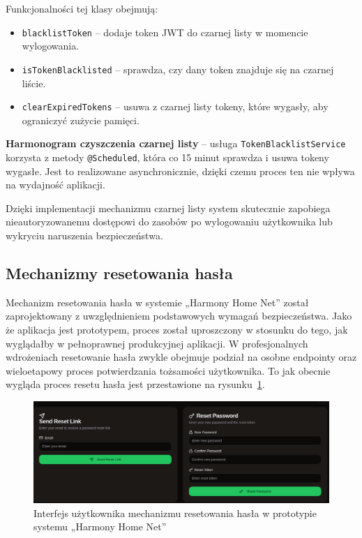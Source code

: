 Funkcjonalności tej klasy obejmują:
\begin{itemize}
    \item \texttt{blacklistToken} -- dodaje token JWT do czarnej listy w momencie wylogowania.
    \item \texttt{isTokenBlacklisted} -- sprawdza, czy dany token znajduje się na czarnej liście.
    \item \texttt{clearExpiredTokens} -- usuwa z czarnej listy tokeny, które wygasły, aby ograniczyć zużycie pamięci.
\end{itemize}

\textbf{Harmonogram czyszczenia czarnej listy} --  usługa \texttt{TokenBlacklistService} korzysta z metody \texttt{@Scheduled}, która co 15 minut sprawdza i usuwa tokeny wygasłe. Jest to realizowane asynchronicznie, dzięki czemu proces ten nie wpływa na wydajność aplikacji.

Dzięki implementacji mechanizmu czarnej listy system skutecznie zapobiega nieautoryzowanemu dostępowi do zasobów po wylogowaniu użytkownika lub wykryciu naruszenia bezpieczeństwa.

\subsection{Mechanizmy resetowania hasła}

Mechanizm resetowania hasła w systemie „Harmony Home Net” został zaprojektowany z uwzględnieniem podstawowych wymagań bezpieczeństwa. Jako że aplikacja jest prototypem, proces został uproszczony w stosunku do tego, jak wyglądałby w pełnoprawnej produkcyjnej aplikacji. W profesjonalnych wdrożeniach resetowanie hasła zwykle obejmuje podział na osobne endpointy oraz wieloetapowy proces potwierdzania tożsamości użytkownika. To jak obecnie wygląda proces resetu hasła jest przestawione na rysunku~\ref{fig:ui_password_reset}.

\begin{figure}[ht]
    \centering
    \includegraphics[width=0.63\linewidth]{rys03/pass_resert}
    \caption{Interfejs użytkownika mechanizmu resetowania hasła w prototypie systemu „Harmony Home Net”}
    \label{fig:ui_password_reset}
\end{figure}

